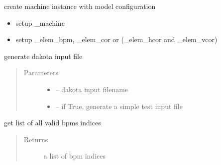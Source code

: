\documentclass[letterpaper,10pt,english]{sphinxmanual}
\begin{document}
\begin{fulllineitems}
\begin{fulllineitems}
\label{\detokenize{src/apidocs/genopt:genopt.DakotaOC.bpms}}
\end{fulllineitems}


\begin{fulllineitems}
\label{\detokenize{src/apidocs/genopt:genopt.DakotaOC.create_machine}}
create machine instance with model configuration
\begin{itemize}
\item {} 
setup \_machine

\item {} 
setup \_elem\_bpm, \_elem\_cor or (\_elem\_hcor and \_elem\_vcor)

\end{itemize}

\end{fulllineitems}


\begin{fulllineitems}
\label{\detokenize{src/apidocs/genopt:genopt.DakotaOC.gen_dakota_input}}
generate dakota input file
\begin{quote}\begin{description}
\item[{Parameters}] \leavevmode\begin{itemize}
\item {} 
 -- dakota input filename

\item {} 
 -- if True, generate a simple test input file

\end{itemize}

\end{description}\end{quote}

\end{fulllineitems}


\begin{fulllineitems}
\label{\detokenize{src/apidocs/genopt:genopt.DakotaOC.get_all_bpms}}
get list of all valid bpms indices
\begin{quote}\begin{description}
\item[{Returns}] \leavevmode
a list of bpm indices


\end{description}
\end{quote}
\end{fulllineitems}
\end{fulllineitems}
\end{document}
